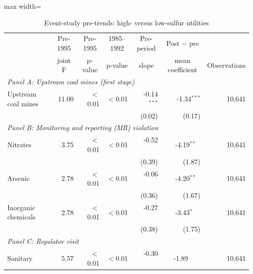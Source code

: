 \begin{table}[htbp]
\raggedright
\begin{minipage}{\linewidth}
\caption{\label{tab:es_highlow_pretrend_k2} Event-study pre-trends: high- versus low-sulfur utilities}
\end{minipage}
\small
{\setlength{\tabcolsep}{4pt}%
\begin{adjustbox}{max width=\linewidth}
\begin{tabular}{p{4.2cm}rrrrrr}
\toprule
 & \multicolumn{1}{c}{Pre-1995} & \multicolumn{1}{c}{Pre-1995} & \multicolumn{1}{c}{1985--1992} & \multicolumn{1}{c}{Pre-period} & \multicolumn{1}{c}{Post $-$ pre} & \\
 & \multicolumn{1}{c}{joint F} & \multicolumn{1}{c}{p-value} & \multicolumn{1}{c}{p-value} & \multicolumn{1}{c}{slope} & \multicolumn{1}{c}{mean coefficient} & \multicolumn{1}{c}{Observations} \\
\hline
\multicolumn{7}{l}{\textit{Panel A: Upstream coal mines (first stage)}} \\
\quad Upstream coal mines & 11.00 & $<$0.01 & $<$0.01 & \phantom{(}-0.14$^{***}$ & \phantom{(}-1.34$^{***}$ & 10,641 \\
 & & & & (\phantom{-}0.02)\phantom{$^{***}$} & (\phantom{-}0.17)\phantom{$^{***}$} & \\
\hline
\multicolumn{7}{l}{\textit{Panel B: Monitoring and reporting (MR) violation}} \\
\quad Nitrates & \phantom{0}3.75 & $<$0.01 & $<$0.01 & \phantom{(}-0.52$^{\phantom{*}\phantom{*}\phantom{*}}$ & \phantom{(}-4.19$^{**\phantom{*}}$ & 10,641 \\
 & & & & (\phantom{-}0.39)\phantom{$^{***}$} & (\phantom{-}1.87)\phantom{$^{***}$} & \\
\quad Arsenic & \phantom{0}2.78 & $<$0.01 & $<$0.01 & \phantom{(}-0.06$^{\phantom{*}\phantom{*}\phantom{*}}$ & \phantom{(}-4.20$^{**\phantom{*}}$ & 10,641 \\
 & & & & (\phantom{-}0.36)\phantom{$^{***}$} & (\phantom{-}1.67)\phantom{$^{***}$} & \\
\quad Inorganic chemicals & \phantom{0}2.78 & $<$0.01 & $<$0.01 & \phantom{(}-0.27$^{\phantom{*}\phantom{*}\phantom{*}}$ & \phantom{(}-3.43$^{*\phantom{*}\phantom{*}}$ & 10,641 \\
 & & & & (\phantom{-}0.38)\phantom{$^{***}$} & (\phantom{-}1.75)\phantom{$^{***}$} & \\
\hline
\multicolumn{7}{l}{\textit{Panel C: Regulator visit}} \\
\quad Sanitary & \phantom{0}5.57 & $<$0.01 & $<$0.01 & \phantom{(}-0.30$^{\phantom{*}\phantom{*}\phantom{*}}$ & \phantom{(}-1.89$^{\phantom{*}\phantom{*}\phantom{*}}$ & 10,641 \\

\end{tabular}
\end{adjustbox}}
\end{table}

